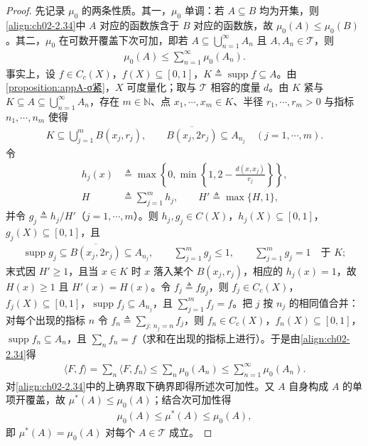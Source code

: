 \documentclass[../../main.tex]{subfiles}%
\begin{document}
\begin{proof}
先记录 $\mu_0$ 的两条性质。其一，$\mu_0$ 单调：若 $A\subseteq B$ 均为开集，则\eqref{align:ch02-2.34}中 $A$ 对应的函数族含于 $B$ 对应的函数族，故 $\mu_0(A)\leqslant\mu_0(B)$。其二，$\mu_0$ 在可数开覆盖下次可加，即若 $A\subseteq\bigcup_{n=1}^\infty A_n$ 且 $A,A_n\in\mathscr T$，则
\begin{align*}
\mu_0(A)\leqslant\sum_{n=1}^\infty\mu_0(A_n).
\end{align*}
事实上，设 $f\in C_c(X)$，$f(X)\subseteq[0,1]$，$K\triangleq\operatorname{supp}f\subseteq A$。由\cref{proposition:appA-σ紧}，$X$ 可度量化；取与 $\mathscr T$ 相容的度量 $d$。由 $K$ 紧与 $K\subseteq A\subseteq\bigcup_{n=1}^\infty A_n$，存在 $m\in\mathbb N$、点 $x_1,\cdots,x_m\in K$、半径 $r_1,\cdots,r_m>0$ 与指标 $n_1,\cdots,n_m$ 使得
\begin{align*}
K\subseteq\bigcup_{j=1}^mB(x_j,r_j),\qquad\overline{B(x_j,2r_j)}\subseteq A_{n_j}\quad(j=1,\cdots,m).
\end{align*}
令
\begin{align*}
h_j(x)&\triangleq\max\left\{0,\min\left\{1,2-\frac{d(x,x_j)}{r_j}\right\}\right\},\\
H&\triangleq\sum_{j=1}^mh_j,\qquad H'\triangleq\max\{H,1\},
\end{align*}
并令 $g_j\triangleq h_j/H'$（$j=1,\cdots,m$）。则 $h_j,g_j\in C(X)$，$h_j(X)\subseteq[0,1]$，$g_j(X)\subseteq[0,1]$，且
\begin{align*}
\operatorname{supp}g_j\subseteq\overline{B(x_j,2r_j)}\subseteq A_{n_j},\qquad\sum_{j=1}^mg_j\leqslant1,\qquad\sum_{j=1}^mg_j=1\quad\text{于 }K;
\end{align*}
末式因 $H'\geqslant1$，且当 $x\in K$ 时 $x$ 落入某个 $B(x_j,r_j)$，相应的 $h_j(x)=1$，故 $H(x)\geqslant1$ 且 $H'(x)=H(x)$。令 $f_j\triangleq fg_j$，则 $f_j\in C_c(X)$，$f_j(X)\subseteq[0,1]$，$\operatorname{supp}f_j\subseteq A_{n_j}$，且 $\sum_{j=1}^mf_j=f$。把 $j$ 按 $n_j$ 的相同值合并：对每个出现的指标 $n$ 令 $f_n\triangleq\sum_{j:\,n_j=n}f_j$，则 $f_n\in C_c(X)$，$f_n(X)\subseteq[0,1]$，$\operatorname{supp}f_n\subseteq A_n$，且 $\sum_nf_n=f$（求和在出现的指标上进行）。于是由\eqref{align:ch02-2.34}得
\begin{align*}
\langle F,f\rangle=\sum_n\langle F,f_n\rangle\leqslant\sum_n\mu_0(A_n)\leqslant\sum_{n=1}^\infty\mu_0(A_n).
\end{align*}
对\eqref{align:ch02-2.34}中的上确界取下确界即得所述次可加性。又 $A$ 自身构成 $A$ 的单项开覆盖，故 $\mu^*(A)\leqslant\mu_0(A)$；结合次可加性得
\begin{align*}
\mu_0(A)\leqslant\mu^*(A)\leqslant\mu_0(A),
\end{align*}
即 $\mu^*(A)=\mu_0(A)$ 对每个 $A\in\mathscr T$ 成立。


\end{proof}
\end{document}
